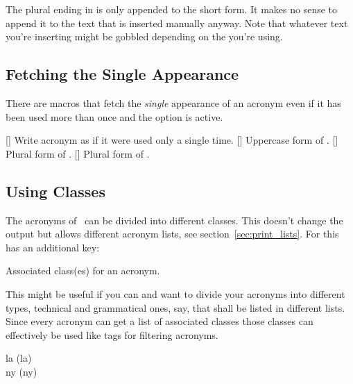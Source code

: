 \documentclass{acro-manual}
\begin{document}
The plural ending in  is only appended to the short form.  It
makes no sense to append it to the text that is inserted manually anyway.
Note that whatever text you're inserting might be gobbled depending on the
 you're using.

\subsection{Fetching the Single Appearance}
There are macros that fetch the \emph{single} appearance of
an acronym even if it has been used more than once and the 
option is active.
\begin{commands}
  [\sarg{}]
    Write acronym as if it were used only a single time.
  [\sarg{}]
    Uppercase form of .
  [\sarg{}]
    Plural form of .
  [\sarg{}]
    Plural form of .
\end{commands}

\begin{example}
\end{example}

\subsection{Using Classes}
The acronyms of \acro\ can be divided into different classes.  This doesn't
change the output but allows different acronym lists, see
section~\vref{sec:print_lists}.  For this  has an additional
key:
\begin{properties}
    Associated class(es) for an acronym.
\end{properties}

This might be useful if you can and want to divide your acronyms into
different types, technical and grammatical ones, say, that shall be listed in
different lists.  Since every acronym can get a list of associated classes
those classes can effectively be used like tags for filtering acronyms.

\begin{example}
  \acl{la} (\acs{la}) \\
  \acl{ny} (\acs{ny})
\end{example}
\end{document}
